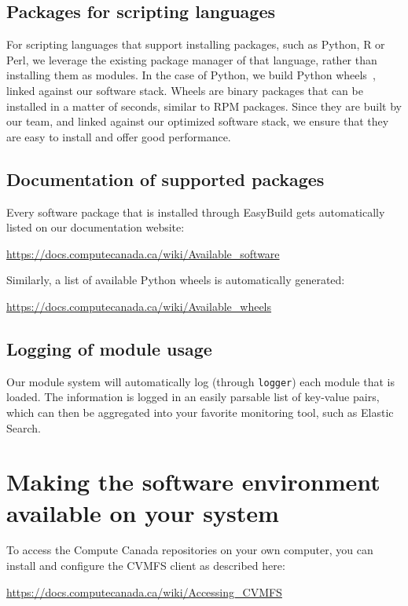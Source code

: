 \documentclass[sigconf]{acmart}
\begin{document}
\subsection{Packages for scripting languages}
\label{sub:Packages_for_scripting_languages}
For scripting languages that support installing packages, such as Python, R or Perl, we leverage the existing package manager of that language, rather than installing them as modules. In the case of Python, we build Python wheels~\cite{Wheels}, linked against our software stack. Wheels are binary packages that can be installed in a matter of seconds, similar to RPM packages. Since they are built by our team, and linked against our optimized software stack, we ensure that they are easy to install and offer good performance.

\subsection{Documentation of supported packages}
\label{sub:Documentation}
Every software package that is installed through EasyBuild gets automatically listed on our documentation website:
\begin{center}
    \url{https://docs.computecanada.ca/wiki/Available_software}
\end{center}
Similarly, a list of available Python wheels is automatically generated:
\begin{center}
\url{https://docs.computecanada.ca/wiki/Available_wheels}    
\end{center}

\subsection{Logging of module usage}
\label{sub:Logging}
Our module system will automatically log (through \texttt{logger}) each module that is loaded. The information is logged in an easily parsable list of key-value pairs, which can then be aggregated into your favorite monitoring tool, such as Elastic Search. 

\section{Making the software environment available on your system}
\label{sec:Making_it_available}
To access the Compute Canada repositories on your own computer, you can install and configure the CVMFS client as described here:
\begin{center}
    \url{https://docs.computecanada.ca/wiki/Accessing_CVMFS}
\end{center}
\end{document}
